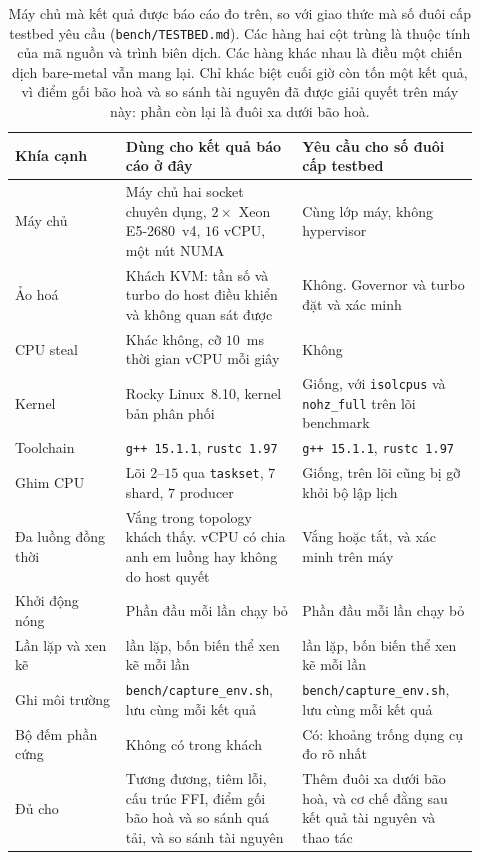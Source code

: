 \begin{table}[H]
\centering
\small
\caption[Máy chủ đã dùng và giao thức testbed còn phải thực hiện]{Máy chủ mà kết quả được báo cáo đo trên, so với giao thức mà số đuôi cấp testbed yêu
cầu (\texttt{bench/TESTBED.md}). Các hàng hai cột trùng là thuộc tính của mã nguồn và
trình biên dịch. Các hàng khác nhau là điều một chiến dịch bare-metal vẫn mang lại. Chỉ khác biệt
cuối giờ còn tốn một kết quả, vì điểm gối bão hoà và so sánh tài nguyên đã được giải quyết trên máy
này: phần còn lại là đuôi xa dưới bão hoà.\label{tab:testbed}}
\renewcommand{\arraystretch}{1.2}
\begin{tabular}{@{}R{0.22\linewidth} R{0.35\linewidth} R{0.35\linewidth}@{}}
\hline\hline
Khía cạnh & Dùng cho kết quả báo cáo ở đây & Yêu cầu cho số đuôi cấp testbed \\
\hline
Máy chủ & Máy chủ hai socket chuyên dụng, $2\times$ Xeon E5-2680~v4, $16$ vCPU, một nút NUMA & Cùng lớp máy, không hypervisor \\
Ảo hoá & Khách KVM: tần số và turbo do host điều khiển và không quan sát được & Không. Governor và turbo đặt và xác minh \\
CPU steal & Khác không, cỡ $10$~ms thời gian vCPU mỗi giây & Không \\
Kernel & Rocky Linux~8.10, kernel bản phân phối & Giống, với \texttt{isolcpus} và \texttt{nohz\_full} trên lõi benchmark \\
Toolchain & \texttt{g++~15.1.1}, \texttt{rustc~1.97} & \texttt{g++~15.1.1}, \texttt{rustc~1.97} \\
Ghim CPU & Lõi $2$--$15$ qua \texttt{taskset}, $7$ shard, $7$ producer & Giống, trên lõi cũng bị gỡ khỏi bộ lập lịch \\
Đa luồng đồng thời & Vắng trong topology khách thấy. vCPU có chia anh em luồng hay không do host quyết & Vắng hoặc tắt, và xác minh trên máy \\
Khởi động nóng & Phần đầu mỗi lần chạy bỏ & Phần đầu mỗi lần chạy bỏ \\
Lần lặp và xen kẽ & \NRepeats{} lần lặp, bốn biến thể xen kẽ mỗi lần & \NRepeats{} lần lặp, bốn biến thể xen kẽ mỗi lần \\
Ghi môi trường & \texttt{bench/capture\_env.sh}, lưu cùng mỗi kết quả & \texttt{bench/capture\_env.sh}, lưu cùng mỗi kết quả \\
Bộ đếm phần cứng & Không có trong khách & Có: khoảng trống dụng cụ đo rõ nhất \\
\hline
Đủ cho & Tương đương, tiêm lỗi, cấu trúc FFI, điểm gối bão hoà và so sánh quá tải, và so sánh tài nguyên & Thêm đuôi xa dưới bão hoà, và cơ chế đằng sau kết quả tài nguyên và thao tác \\
\hline
\end{tabular}
\end{table}

